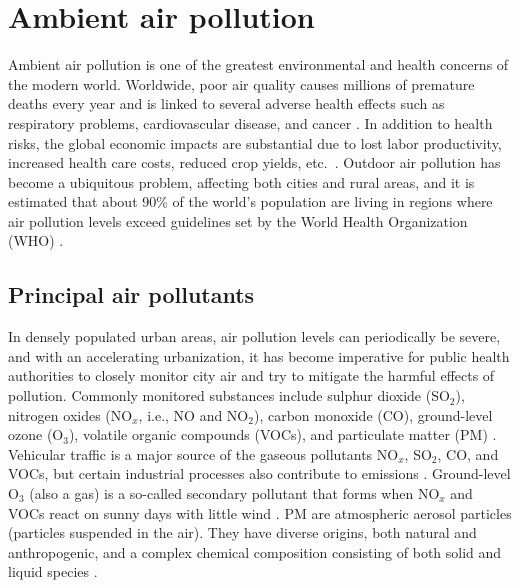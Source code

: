\section{Ambient air pollution}

Ambient air pollution is one of the greatest environmental and health concerns of the modern world. Worldwide, poor air quality causes millions of premature deaths every year and is linked to several adverse health effects such as respiratory problems, cardiovascular disease, and cancer \cite{who2016}. In addition to health risks, the global economic impacts are substantial due to lost labor productivity, increased health care costs, reduced crop yields, etc.\ \cite{oecd2016}. Outdoor air pollution has become a ubiquitous problem, affecting both cities and rural areas, and it is estimated that about 90\% of the world's population are living in regions where air pollution levels exceed guidelines set by the World Health Organization (WHO) \cite{who2016}. 

\subsection{Principal air pollutants}
\label{sec:airpollutants}
In densely populated urban areas, air pollution levels can periodically be severe, and with an accelerating urbanization, it has become imperative for public health authorities to closely monitor city air and try to mitigate the harmful effects of pollution. Commonly monitored substances include sulphur dioxide (SO$_2$), nitrogen oxides (NO$_x$, i.e., NO and NO$_2$), carbon monoxide (CO), ground-level ozone (O$_3$), volatile organic compounds (VOCs), and particulate matter (PM) \cite{VanLoon2010}. Vehicular traffic is a major source of the gaseous pollutants NO$_x$, SO$_2$, CO, and VOCs, but certain industrial processes also contribute to emissions \cite{VanLoon2010}. Ground-level O$_3$ (also a gas) is a so-called secondary pollutant that forms when NO$_x$ and VOCs react on sunny days with little wind \cite{VanLoon2010}. PM are atmospheric aerosol particles (particles suspended in the air). They have diverse origins, both natural and anthropogenic, and a complex chemical composition consisting of both solid and liquid species \cite{VanLoon2010}.

